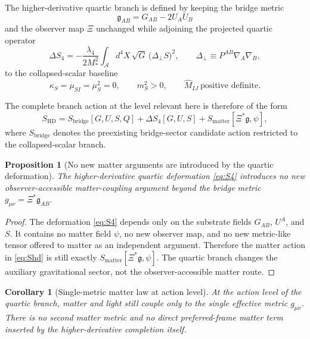 \documentclass[11pt]{article}
\newcommand{\Sub}{\mathcal{A}}
\newcommand{\BridgeMetric}{\mathfrak{g}}
\newtheorem{proposition}{Proposition}
\newtheorem{corollary}{Corollary}
\begin{document}
The higher-derivative quartic branch is defined by keeping the bridge metric
\begin{equation}
\BridgeMetric_{AB}=G_{AB}-2U_AU_B
\label{eq:bridge}
\end{equation}
and the observer map \(\Xi\) unchanged while adjoining the projected quartic operator
\begin{equation}
\Delta S_4
=
-\frac{\lambda_4}{2M_*^2}
\int_{\Sub} d^4X\,\sqrt{G}\,
\bigl(\Delta_{\perp}S\bigr)^2,
\qquad
\Delta_{\perp}\equiv P^{AB}\nabla_A\nabla_B,
\label{eq:S4}
\end{equation}
to the collapsed-scalar baseline
\begin{equation}
\kappa_S=\mu_{SI}=\mu_S^2=0,
\qquad
m_S^2>0,
\qquad
\widehat M_{IJ}\ \text{positive definite}.
\label{eq:quarticbaseline}
\end{equation}

The complete branch action at the level relevant here is therefore of the form
\begin{equation}
S_{\mathrm{HD}}
=
S_{\mathrm{bridge}}[G,U,S,Q]
+
\Delta S_4[G,U,S]
+
S_{\mathrm{matter}}[\Xi^*\BridgeMetric,\psi],
\label{eq:Shd}
\end{equation}
where \(S_{\mathrm{bridge}}\) denotes the preexisting bridge-sector candidate action restricted to the collapsed-scalar branch.

\begin{proposition}[No new matter arguments are introduced by the quartic deformation]
The higher-derivative quartic deformation \eqref{eq:S4} introduces no new observer-accessible matter-coupling argument beyond the bridge metric \(g_{\mu\nu}=\Xi^*\BridgeMetric_{AB}\).
\end{proposition}

\begin{proof}
The deformation \eqref{eq:S4} depends only on the substrate fields \(G_{AB}\), \(U^A\), and \(S\). It contains no matter field \(\psi\), no new observer map, and no new metric-like tensor offered to matter as an independent argument. Therefore the matter action in \eqref{eq:Shd} is still exactly \(S_{\mathrm{matter}}[\Xi^*\BridgeMetric,\psi]\). The quartic branch changes the auxiliary gravitational sector, not the observer-accessible matter route.
\end{proof}

\begin{corollary}[Single-metric matter law at action level]
At the action level of the quartic branch, matter and light still couple only to the single effective metric \(g_{\mu\nu}\). There is no second matter metric and no direct preferred-frame matter term inserted by the higher-derivative completion itself.
\end{corollary}
\end{document}
